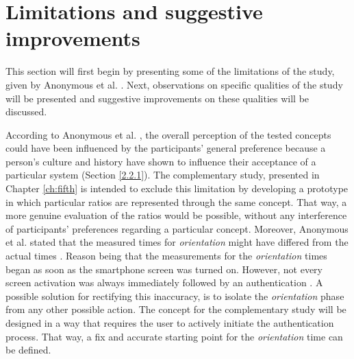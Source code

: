 \section{Limitations and suggestive improvements} \label{3.3}

This section will first begin by presenting some of the limitations of the study, given by Anonymous et al. \cite{anonymous}. Next, observations on specific qualities of the study will be presented and suggestive improvements on these qualities will be discussed. 

According to Anonymous et al. \cite{anonymous}, the overall perception of the tested concepts could have been influenced by the participants' general preference \cite{anonymous} because a person's culture and history have shown to influence their acceptance of a particular system \cite{Harbach:2016} (Section \ref{2.2.1}). The complementary study, presented in Chapter \ref{ch:fifth} is intended to exclude this limitation by developing a prototype in which particular ratios are represented through the same concept. That way, a more genuine evaluation of the ratios would be possible, without any interference of participants' preferences regarding a particular concept. Moreover, Anonymous et al. \cite{anonymous} stated that the measured times for \textit{orientation} might have differed from the actual times \cite{anonymous}. Reason being that the measurements for the \textit{orientation} times began as soon as the smartphone screen was turned on. However, not every screen activation was always immediately followed by an authentication \cite{anonymous}. A possible solution for rectifying this inaccuracy, is to isolate the \textit{orientation} phase from any other possible action. The concept for the complementary study will be designed in a way that requires the user to actively initiate the authentication process. That way, a fix and accurate starting point for the \textit{orientation} time can be defined.\\

